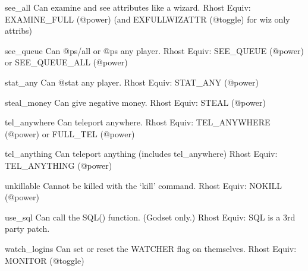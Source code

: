 \documentclass[letterpaper,10pt,english]{sphinxmanual}
\begin{document}
\sphinxAtStartPar
see\_all               Can examine and see attributes like a wizard.
Rhost Equiv: EXAMINE\_FULL (@power) (and EXFULLWIZATTR (@toggle) for wiz only attribs)

\sphinxAtStartPar
see\_queue             Can @ps/all or @ps any player.
Rhost Equiv: SEE\_QUEUE (@power) or SEE\_QUEUE\_ALL (@power)

\sphinxAtStartPar
stat\_any              Can @stat any player.
Rhost Equiv: STAT\_ANY (@power)

\sphinxAtStartPar
steal\_money           Can give negative money.
Rhost Equiv: STEAL (@power)

\sphinxAtStartPar
tel\_anywhere          Can teleport anywhere.
Rhost Equiv: TEL\_ANYWHERE (@power) or FULL\_TEL (@power)

\sphinxAtStartPar
tel\_anything          Can teleport anything (includes tel\_anywhere)
Rhost Equiv: TEL\_ANYTHING (@power)

\sphinxAtStartPar
unkillable            Cannot be killed with the ‘kill’ command.
Rhost Equiv: NOKILL (@power)

\sphinxAtStartPar
use\_sql               Can call the SQL() function. (God\sphinxhyphen{}set only.)
Rhost Equiv: SQL is a 3rd party patch.

\sphinxAtStartPar
watch\_logins          Can set or reset the WATCHER flag on themselves.
Rhost Equiv: MONITOR (@toggle)
\end{document}
